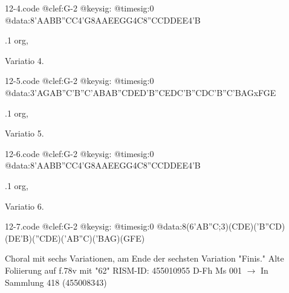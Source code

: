 \documentclass[twocolumn]{book}
\begin{document}
\begin{filecontents*}{12-4.code}
@clef:G-2
@keysig:
@timesig:0
@data:{8'AABB}{''CC}4'G{8AAEE}{GG}4C{8''CCDD}{EE}4'B
\end{filecontents*}
\newline
%
.1  org, \begin{itshape}Variatio 4.\end{itshape}  
\begin{filecontents*}{12-5.code}
@clef:G-2
@keysig:
@timesig:0
@data:{3'AGAB}{''C'B''C'A}{BAB''C}{DED'B}{''CEDC}{'B''CDC}{'B''C'BA}{GxFGE}
\end{filecontents*}
\newline
%
.1  org, \begin{itshape}Variatio 5.\end{itshape}  
\begin{filecontents*}{12-6.code}
@clef:G-2
@keysig:
@timesig:0
@data:{8'AABB}{''CC}4'G{8AAEE}{GG}4C{8''CCDD}{EE}4'B
\end{filecontents*}
\newline
%
.1  org, \begin{itshape}Variatio 6.\end{itshape}  
\begin{filecontents*}{12-7.code}
@clef:G-2
@keysig:
@timesig:0
@data:8(6{'AB''C};3)({CDE})({'B''CD})({DE'B})({''CDE})({'AB''C})({'BAG})({GFE})
\end{filecontents*}
\newline
%
\newline Choral mit sechs Variationen, am Ende der sechsten Variation "Finis."
\newline Alte Foliierung auf f.78v mit "62"
\newline RISM-ID: 455010955
\newline D-Fh  Ms 001
\newline $\rightarrow$ In Sammlung 418 (455008343)
      
\end{document}
